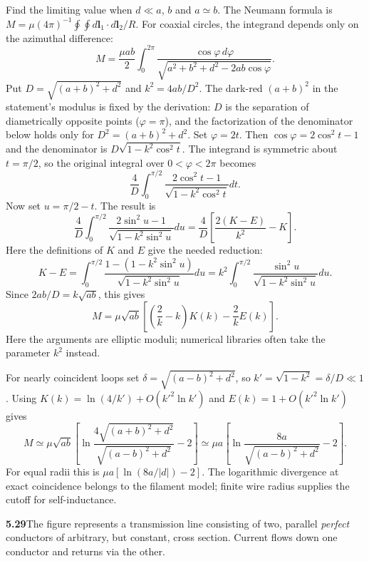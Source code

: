 Find the limiting value when $d\ll a$, $b$ and $a\simeq b$.
\solution
The Neumann formula is
$M=\mu(4\pi)^{-1}\oint\oint d\mathbf l_1\cdot d\mathbf l_2/R$.
For coaxial circles, the integrand depends only on the azimuthal difference:
\[
M=\frac{\mu ab}{2}\int_0^{2\pi}
\frac{\cos\varphi\,d\varphi}
{\sqrt{a^2+b^2+d^2-2ab\cos\varphi}}.
\]
Put $D=\sqrt{(a+b)^2+d^2}$ and $k^2=4ab/D^2$.
The dark-red $(a+b)^2$ in the statement's modulus is fixed by the
derivation: $D$ is the separation of diametrically opposite points
($\varphi=\pi$), and the factorization of the denominator below holds
only for $D^2=(a+b)^2+d^2$.
Set $\varphi=2t$. Then $\cos\varphi=2\cos^2t-1$ and
the denominator is $D\sqrt{1-k^2\cos^2t}$.
The integrand is symmetric about $t=\pi/2$, so the original integral
over $0<\varphi<2\pi$ becomes
\[
\frac4D\int_0^{\pi/2}
\frac{2\cos^2t-1}{\sqrt{1-k^2\cos^2t}}dt.
\]
Now set $u=\pi/2-t$. The result is
\[
\frac4D\int_0^{\pi/2}
\frac{2\sin^2u-1}{\sqrt{1-k^2\sin^2u}}du
=\frac4D\left[\frac{2(K-E)}{k^2}-K\right].
\]
Here the definitions of $K$ and $E$ give the needed reduction:
\[
K-E=\int_0^{\pi/2}
\frac{1-(1-k^2\sin^2u)}{\sqrt{1-k^2\sin^2u}}du
=k^2\int_0^{\pi/2}\frac{\sin^2u}{\sqrt{1-k^2\sin^2u}}du.
\]
Since $2ab/D=k\sqrt{ab}$, this gives
\[
\boxed{M=\mu\sqrt{ab}
\left[\left(\frac2k-k\right)K(k)-\frac2kE(k)\right].}
\]
Here the arguments are elliptic moduli; numerical libraries often
take the parameter $k^2$ instead.

For nearly coincident loops set
$\delta=\sqrt{(a-b)^2+d^2}$, so
$k'=\sqrt{1-k^2}=\delta/D\ll1$.
Using $K(k)=\ln(4/k')+O(k'^2\ln k')$ and
$E(k)=1+O(k'^2\ln k')$ gives
\[
\boxed{M\simeq\mu\sqrt{ab}
\left[\ln\frac{4\sqrt{(a+b)^2+d^2}}{\sqrt{(a-b)^2+d^2}}-2\right]
\simeq\mu a\left[\ln\frac{8a}{\sqrt{(a-b)^2+d^2}}-2\right].}
\]
For equal radii this is $\mu a[\ln(8a/|d|)-2]$.
The logarithmic divergence at exact coincidence belongs to the
filament model; finite wire radius supplies the cutoff for self-inductance.


\par\bigskip
\noindent\textbf{5.29}\quad The figure represents a transmission line consisting of two, parallel \emph{perfect} conductors of arbitrary, but constant, cross section. Current flows down one conductor and returns via the other.

